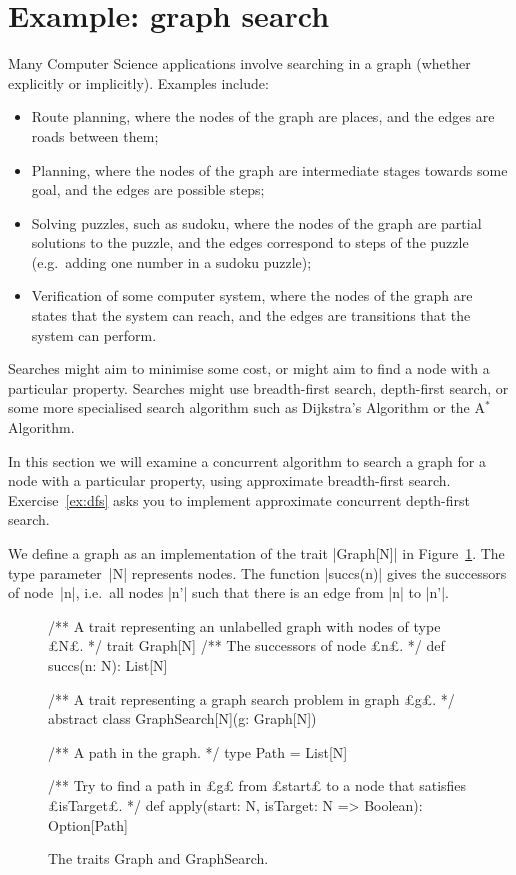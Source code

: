 \section{Example: graph search}

Many Computer Science applications involve searching in a graph (whether
explicitly or implicitly).  Examples include:
%
\begin{itemize}
\item Route planning, where the nodes of the graph are places, and the edges
  are roads between them;

\item Planning, where the nodes of the graph are intermediate stages towards
  some goal, and the edges are possible steps;

\item Solving puzzles, such as sudoku, where the nodes of the graph are
  partial solutions to the puzzle, and the edges correspond to steps of the
  puzzle (e.g.~adding one number in a sudoku puzzle);

\item Verification of some computer system, where the nodes of the graph are
  states that the system can reach, and the edges are transitions that the
  system can perform.  
\end{itemize}
%
Searches might aim to minimise some cost, or might aim to find a node with a
particular property.  Searches might use breadth-first search, depth-first
search, or some more specialised search algorithm such as Dijkstra's Algorithm
or the A$^*$ Algorithm.

In this section we will examine a concurrent algorithm to search a graph for a
node with a particular property, using approximate breadth-first search.
Exercise~\ref{ex:dfs} asks you to implement approximate concurrent
depth-first search.

We define a graph as an implementation of the trait |Graph[N]| in
Figure~\ref{fig:graph}.  The type parameter~|N| represents nodes.  The
function |succs(n)| gives the successors of node~|n|, i.e.~all nodes |n'| such
that there is an edge from |n| to |n'|.


\begin{figure}
\begin{scala}
/** A trait representing an unlabelled graph with nodes of type £N£. */
trait Graph[N]{
  /** The successors of node £n£. */
  def succs(n: N): List[N]
}

/** A trait representing a graph search problem in graph £g£. */
abstract class GraphSearch[N](g: Graph[N]){
  /** A path in the graph. */
  type Path = List[N]

  /** Try to find a path in £g£ from £start£ to a node that satisfies £isTarget£. */
  def apply(start: N, isTarget: N => Boolean): Option[Path]
}
\end{scala}
\caption{The traits {\scalashape Graph} and {\scalashape GraphSearch}.}
\label{fig:graph}
\end{figure}

